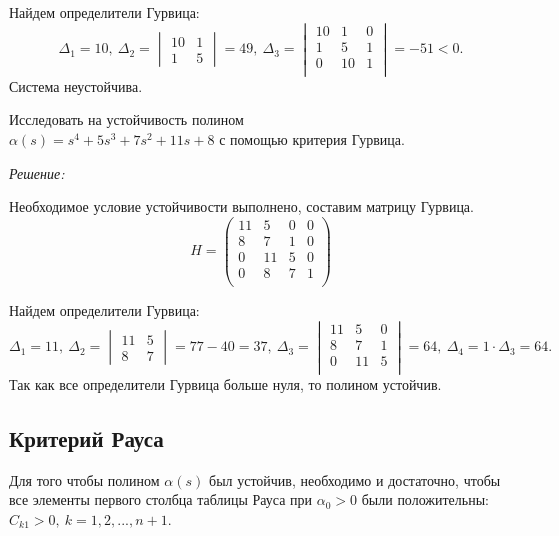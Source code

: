 \documentclass[../../TAU.tex]{subfiles}
\begin{document}
    Найдем определители Гурвица: 
    $$
    \Delta_1=10,\ \Delta_2 = 
    \begin{vmatrix}
        10 & 1\\
        1  & 5
    \end{vmatrix}
    =49,\ \Delta_3=
    \begin{vmatrix}
        10 & 1 & 0\\
        1  & 5 & 1\\
        0 & 10 & 1\\
    \end{vmatrix}
    =-51<0.
    $$
    Система неустойчива.

    \examp Исследовать на устойчивость полином\\
    $\alpha(s) = s^4+5s^3+7s^2+11s+8$ 
    с помощью критерия Гурвица.

    {\it Решение:}\par
    Необходимое условие устойчивости выполнено, составим матрицу Гурвица.
    $$
        H = 
        \begin{pmatrix}
            11 & 5 & 0 & 0\\
            8 & 7 & 1 & 0 \\
            0 & 11 & 5 & 0\\
            0 & 8 & 7 & 1 \\
        \end{pmatrix}
    $$

    Найдем определители Гурвица: 
    $$
    \Delta_1=11,\ \Delta_2 = 
    \begin{vmatrix}
        11 & 5\\
        8  & 7
    \end{vmatrix}
    =77 - 40=37,\ \Delta_3=
    \begin{vmatrix}
        11 & 5 & 0\\
        8  & 7 & 1\\
        0 & 11 & 5\\
    \end{vmatrix}
    =64,\ \Delta_4=1 \cdot \Delta_3=64.
    $$
    Так как все определители Гурвица больше нуля, то полином устойчив. 

\subsection{Критерий Рауса}

    \theor[Рауса] Для того чтобы полином 
    $\alpha(s)$ был устойчив, необходимо и достаточно, чтобы все элементы первого столбца таблицы Рауса при $\alpha_0 > 0$ были положительны: 
    $C_{k1}>0,\ k=1, 2,..., n+1$.
\end{document}
